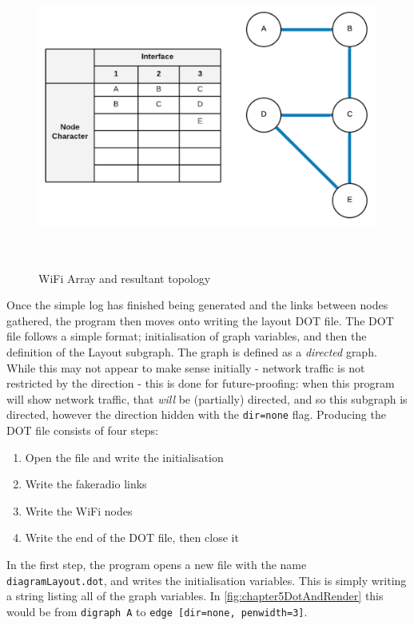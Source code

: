 \begin{figure}
    \begin{centering}
        \includegraphics[width=15cm,height=10cm,keepaspectratio]{Figures/Chapter5-WifiArrayResult.png}
        \caption{WiFi Array and resultant topology}
        \label{fig:chapter5ResultWifiTopology}
    \end{centering}
\end{figure}

Once the simple log has finished being generated and the links between nodes gathered, the program then moves onto writing the layout DOT file.
The DOT file follows a simple format; initialisation of graph variables, and then the definition of the Layout subgraph.
The graph is defined as a \emph{directed} graph.
While this may not appear to make sense initially - network traffic is not restricted by the direction - this is done for future-proofing: when this program will show network traffic, that \emph{will} be (partially) directed, and so this subgraph is directed, however the direction hidden with the \verb|dir=none| flag.
Producing the DOT file consists of four steps:
\begin{enumerate}
    \item Open the file and write the initialisation
    \item Write the fakeradio links
    \item Write the WiFi nodes
    \item Write the end of the DOT file, then close it
\end{enumerate}

In the first step, the program opens a new file with the name \verb|diagramLayout.dot|, and writes the initialisation variables.
This is simply writing a string listing all of the graph variables. 
In \figurename{ \ref{fig:chapter5DotAndRender}} this would be from \verb|digraph A| to \verb|edge [dir=none, penwidth=3]|.

